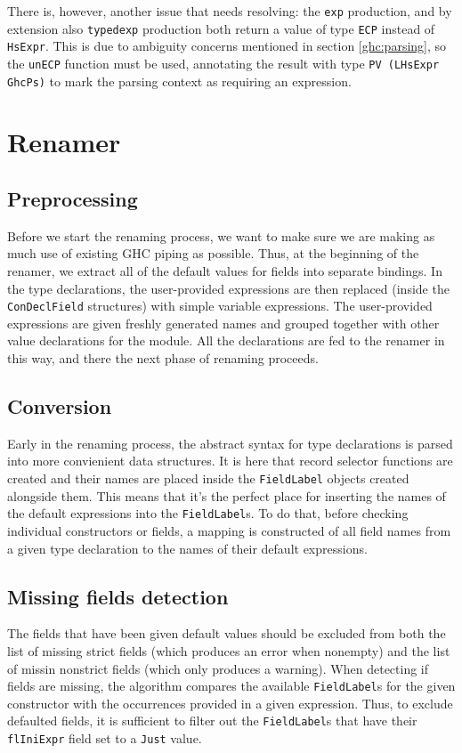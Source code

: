 \documentclass[en]{pracamgr}
\newcommand{\code}[1]{\lstinline[breaklines=true]{#1}}
\begin{document}
There is, however, another issue that needs resolving: the \code{exp} production, and by extension also \code{typedexp} 
production both return a value of type \code{ECP} instead of \code{HsExpr}. This is due to ambiguity concerns 
mentioned in section \ref*{ghc:parsing}, so the \code{unECP} function must be used, 
annotating the result with type \code{PV (LHsExpr GhcPs)} to mark the parsing context as requiring an expression.

\section{Renamer}
\subsection{Preprocessing}
Before we start the renaming process, we want to make sure we are making as much use of existing GHC piping as possible.
Thus, at the beginning of the renamer, we extract all of the default values for fields into separate bindings.
In the type declarations, the user-provided expressions are then replaced (inside the \code{ConDeclField} structures) with simple variable expressions.
The user-provided expressions are given freshly generated names and grouped together with other value declarations for the module.
All the declarations are fed to the renamer in this way, and there the next phase of renaming proceeds.
\subsection{Conversion}
Early in the renaming process, the abstract syntax for type declarations is parsed into more convienient data structures.
It is here that record selector functions are created and their names are placed inside the \code{FieldLabel} objects created alongside them.
This means that it's the perfect place for inserting the names of the default expressions into the \code{FieldLabel}s.
To do that, before checking individual constructors or fields, a mapping is constructed of all field names from a given type declaration to the names of their default expressions.
\subsection{Missing fields detection}
The fields that have been given default values should be excluded from both the list of missing strict fields (which produces an error when nonempty) and the list of missin nonstrict fields (which only produces a warning).
When detecting if fields are missing, the algorithm compares the available \code{FieldLabel}s for the given constructor with the occurrences provided in a given expression.
Thus, to exclude defaulted fields, it is sufficient to filter out the \code{FieldLabel}s that have their \code{flIniExpr} field set to a \code{Just} value.
\end{document}

